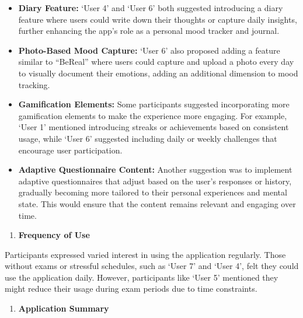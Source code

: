 \begin{itemize}
    \item \textbf{Diary Feature:} `User 4' and `User 6' both suggested introducing a diary feature where users could write down their thoughts or capture daily insights, further enhancing the app's role as a personal mood tracker and journal.

    \item \textbf{Photo-Based Mood Capture:} `User 6' also proposed adding a feature similar to ``BeReal'' where users could capture and upload a photo every day to visually document their emotions, adding an additional dimension to mood tracking.

    \item \textbf{Gamification Elements:} Some participants suggested incorporating more gamification elements to make the experience more engaging. For example, `User 1' mentioned introducing streaks or achievements based on consistent usage, while `User 6' suggested including daily or weekly challenges that encourage user participation.

    \item \textbf{Adaptive Questionnaire Content:} Another suggestion was to implement adaptive questionnaires that adjust based on the user’s responses or history, gradually becoming more tailored to their personal experiences and mental state. This would ensure that the content remains relevant and engaging over time.
\end{itemize}

\begin{enumerate}[resume]
    \item \textbf{Frequency of Use}
\end{enumerate}

\noindent Participants expressed varied interest in using the application regularly. Those without exams or stressful schedules, such as `User 7' and `User 4', felt they could use the application daily. However, participants like `User 5' mentioned they might reduce their usage during exam periods due to time constraints.

\begin{enumerate}[resume]
    \item \textbf{Application Summary}
\end{enumerate}

